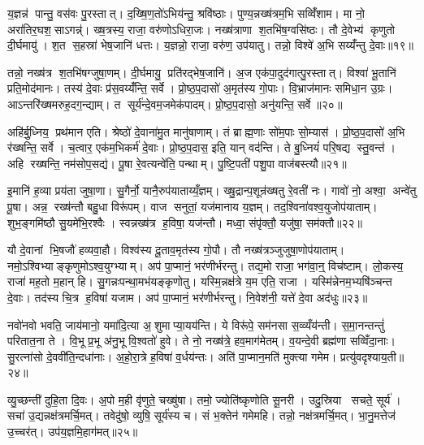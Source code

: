 य॒ज्ञन्न॑ पान्तु॒ वस॑वः पु॒रस्तात्। द॒ख्षि॒ण॒तो॑ऽभिय॑न्तु॒ श्रवि॑ष्ठाः। पुण्य॒न्नख्ष॑त्रम॒भि सव्विँ॑शाम। मा नो॒ अरा॑तिर॒घश॒साऽगन्न्॑। ख्ष॒त्रस्य॒ राजा॒ वरु॑णोऽधिरा॒जः। नख्ष॑त्राणा श॒तभि॑ष॒ग्वसि॑ष्ठः। तौ दे॒वेभ्य॑ कृणुतो दी॒र्घमायु॑। श॒त स॒हस्रा॑ भेष॒जानि॑ धत्तः। य॒ज्ञन्नो॒ राजा॒ वरु॑ण॒ उप॑यातु। तन्नो॒ विश्वे॑ अ॒भि सय्यँ॑न्तु दे॒वाः॥१९॥

तन्नो॒ नख्ष॑त्र श॒तभि॑षग्जुषा॒णम्। दी॒र्घमायु॒ प्रति॑रद्भेष॒जानि॑। अ॒ज एक॑पा॒दुद॑गात्पु॒रस्तात्। विश्वा॑ भू॒तानि॑ प्रति॒मोद॑मानः। तस्य॑ दे॒वाः प्र॑स॒वय्यँ॑न्ति॒ सर्वे। प्रो॒ष्ठ॒प॒दासो॑ अ॒मृत॑स्य गो॒पाः। वि॒भ्राज॑मानः समिधा॒न उ॒ग्रः। आऽन्तरि॑ख्षमरुह॒दग॒न्द्याम्। त सूर्य॑न्दे॒वम॒जमेक॑पादम्। प्रो॒ष्ठ॒प॒दासो॒ अनु॑यन्ति॒ सर्वे॥२०॥

अहि॑र्बु॒ध्निय॒ प्रथ॑मान एति। श्रेष्ठो॑ दे॒वाना॑मु॒त मानु॑षाणाम्। तं ब्राह्म॒णाः सो॑म॒पाः सो॒म्यास॑। प्रो॒ष्ठ॒प॒दासो॑ अ॒भि र॑ख्षन्ति॒ सर्वे। च॒त्वार॒ एक॑म॒भिकर्म॑ दे॒वाः। प्रो॒ष्ठ॒प॒दास॒ इति॒ यान् वद॑न्ति। ते बु॒ध्नियं॑ परि॒षद्य स्तु॒वन्त॑। अहि रख्षन्ति॒ नम॑सोप॒सद्य॑। पू॒षा रे॒वत्यन्वे॑ति॒ पन्थाम्। पु॒ष्टि॒पती॑ पशु॒पा वाज॑बस्त्यौ॥२१॥

इ॒मानि॑ ह॒व्या प्रय॑ता जुषा॒णा। सु॒गैर्नो॒ यानै॒रुप॑याताय्यँ॒ज्ञम्। ख्षु॒द्रान्प॒शून्र॑ख्षतु रे॒वती॑ नः। गावो॑ नो॒ अश्वा॒ अन्वे॑तु पू॒षा। अन्न॒ रख्ष॑न्तौ बहु॒धा विरू॑पम्। वाज सनुतां॒ यज॑मानाय य॒ज्ञम्। तद॒श्विना॑वश्व॒युजोप॑याताम्। शुभ॒ङ्गमि॑ष्ठौ सु॒यमे॑भि॒रश्वैः। स्वन्नख्ष॑त्र ह॒विषा॒ यज॑न्तौ। मध्वा॒ संपृ॑क्तौ॒ यजु॑षा॒ सम॑क्तौ॥२२॥

यौ दे॒वानां भि॒षजौ॑ हव्यवा॒हौ। विश्व॑स्य दू॒ताव॒मृत॑स्य गो॒पौ। तौ नख्ष॑त्रञ्जुजुषा॒णोप॑याताम्। नमो॒ऽश्विभ्याङ्कृणुमोऽश्व॒युग्भ्याम्। अप॑ पा॒प्मानं॒ भर॑णीर्भरन्तु। तद्य॒मो राजा॒ भग॑वा॒न्॒ विच॑ष्टाम्। लो॒कस्य॒ राजा॑ मह॒तो म॒हान् हि। सु॒गन्नःपन्था॒मभ॑यङ्कृणोतु। यस्मि॒न्नक्ष॑त्रे य॒म एति॒ राजा। यस्मि॑न्नेनम॒भ्यषि॑ञ्चन्त दे॒वाः। तद॑स्य चि॒त्र ह॒विषा॑ यजाम। अप॑ पा॒प्मानं॒ भर॑णीर्भरन्तु। नि॒वेश॑नी॒ यत्ते॑ दे॒वा अद॑धुः॥२३॥\anuvakamend[त॒तार॒ मह्यं॑ प्रास॒चीर्या यान्तु य॒ज्ञव्वाँच स्व॒स्ति दे॒वा अनु॑यन्ति॒ सर्वे॒ वाज॑बस्त्यौ॒ सम॑क्तौ दे॒वास्त्रीणि॑ च]

नवो॑नवो भवति॒ जाय॑मानो॒ यमा॑दि॒त्या अ॒शुमाप्या॒यय॑न्ति। ये विरू॑पे॒ सम॑नसा स॒व्व्यँय॑न्ती। स॒मा॒नन्तन्तुं॑ परितात॒ना ते। वि॒भू प्र॒भू अ॑नु॒भू वि॒श्वतो॑ हुवे। ते नो॒ नख्ष॑त्रे॒ हव॒माग॑मेतम्। व॒यन्दे॒वी ब्रह्म॑णा सव्विँदा॒नाः। सु॒रत्ना॑सो दे॒ववी॑ति॒न्दधा॑नाः। अ॒हो॒रा॒त्रे ह॒विषा॑ व॒र्धय॑न्तः। अति॑ पा॒प्मान॒मति॑ मुक्त्या गमेम। प्रत्यु॑वदृश्याय॒ती॥२४॥

व्यु॒च्छन्ती॑ दुहि॒ता दि॒वः। अ॒पो म॒ही वृ॑णुते॒ चख्षु॑षा। तमो॒ ज्योति॑ष्कृणोति सू॒नरी। उदु॒स्रिया सचते॒ सूर्य॑। सचा॑ उ॒द्यन्नक्ष॑त्रमर्चि॒मत्। तवेदु॑षो॒ व्युषि॒ सूर्य॑स्य च। सं भ॒क्तेन॑ गमेमहि। तन्नो॒ नक्ष॑त्रमर्चि॒मत्। भा॒नु॒मत्तेज॑ उ॒च्चर॑त्। उप॑य॒ज्ञमि॒हाग॑मत्॥२५॥

